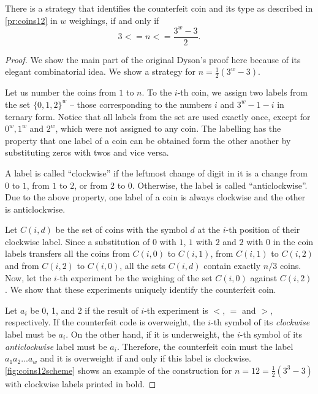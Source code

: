\begin{theorem}\label{th:coins12}
There is a strategy that identifies the counterfeit coin and
  its type as described in \autoref{pr:coins12} in $w$ weighings,
  if and only if
  \[ 3 <= n <=\frac{3^w - 3}{2}. \]
\end{theorem}

\begin{proof}
We show the main part of the original Dyson's proof\cite{coins-dyson1946}
  here because of its elegant combinatorial idea.
We show a strategy for $n = \frac{1}{2}(3^w - 3)$.

Let us number the coins from $1$ to $n$.
To the $i$-th coin, we assign
  two labels from the set $\{0,1,2\}^w$ -- those corresponding to the numbers
  $i$ and $3^w - 1 - i$ in ternary form.
Notice that all labels from the set are used exactly once, except for $0^w, 1^w$
  and $2^w$, which were not assigned to any coin.
The labelling has the property that
  one label of a coin
  can be obtained form the other another by substituting zeros with twos
  and vice versa.

A label is called ``clockwise'' if the leftmost change of digit in it is
a change from $0$ to $1$, from $1$ to $2$, or from $2$ to $0$.
Otherwise, the label is called ``anticlockwise''.
Due to the above property, one label of a coin is always
  clockwise and the other is anticlockwise.

Let $C(i, d)$ be the set of coins
  with the symbol $d$ at the $i$-th position of their clockwise label.
Since a substitution of $0$ with $1$, $1$ with $2$ and $2$ with $0$ in the coin labels
  transfers all the coins from $C(i,0)$ to $C(i,1)$,
        from $C(i,1)$ to $C(i,2)$ and
        from $C(i,2)$ to $C(i,0)$,
  all the sets $C(i, d)$ contain exactly $n/3$ coins.
Now, let the $i$-th experiment be the weighing of the set $C(i,0)$ against $C(i, 2)$.
We show that these experiments uniquely identify the counterfeit coin.

Let $a_i$ be 0, 1, and 2 if the result of $i$-th experiment is
  $<$, $=$ and $>$, respectively.
If the counterfeit code is overweight, the $i$-th symbol of its \emph{clockwise} label
  must be $a_i$. On the other hand, if it is underweight, the $i$-th symbol of
  its \emph{anticlockwise} label must be $a_i$.
Therefore, the counterfeit coin must the label $a_1a_2...a_w$
  and it is overweight if and only if this label is clockwise.
\autoref{fig:coins12scheme} shows an example of the construction for
  $n = 12 = \frac{1}{2}(3^3 - 3)$ with clockwise labels printed in bold.


\end{proof}
